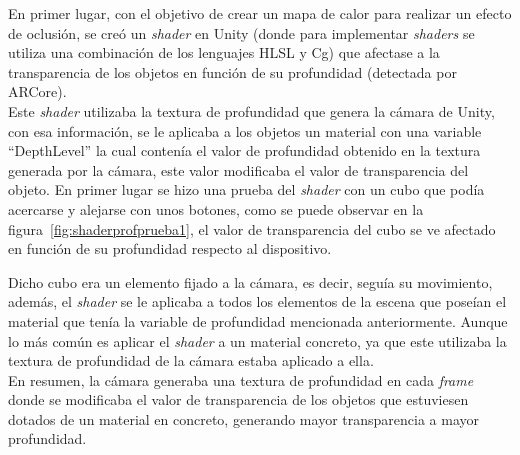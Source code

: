 
En primer lugar, con el objetivo de crear un mapa de calor para realizar un efecto de oclusión, se creó un \textit{shader} en Unity (donde para implementar \textit{shaders} se utiliza una combinación de los lenguajes HLSL y Cg) que afectase a la transparencia de los objetos en función de su profundidad (detectada por ARCore).\\


Este \textit{shader} utilizaba la textura de profundidad que genera la cámara de Unity\footnotemark, con esa información, se le aplicaba a los objetos un material con una variable ``DepthLevel'' la cual contenía el valor de profundidad obtenido en la textura generada por la cámara, este valor modificaba el valor de transparencia del objeto. En primer lugar se hizo una prueba del \textit{shader} con un cubo que podía acercarse y alejarse con unos botones, como se puede observar en la figura~\ref{fig:shaderprofprueba1}, el valor de transparencia del cubo se ve afectado en función de su profundidad respecto al dispositivo.\\


Dicho cubo era un elemento fijado a la cámara, es decir, seguía su movimiento, además, el \textit{shader} se le aplicaba a todos los elementos de la escena que poseían el material que tenía la variable de profundidad mencionada anteriormente. Aunque lo más común es aplicar el \textit{shader} a un material concreto, ya que este utilizaba la textura de profundidad de la cámara estaba aplicado a ella.\\

En resumen, la cámara generaba una textura de profundidad en cada \textit{frame} donde se modificaba el valor de transparencia de los objetos que estuviesen dotados de un material en concreto, generando mayor transparencia a mayor profundidad.


